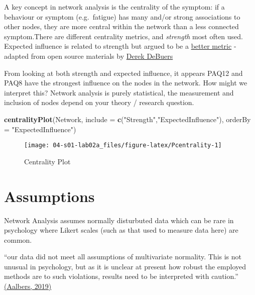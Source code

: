 \documentclass[]{book}
\newenvironment{Shaded}{\begin{snugshade}}{\end{snugshade}}
\newcommand{\DataTypeTok}[1]{\textcolor[rgb]{0.13,0.29,0.53}{#1}}
\newcommand{\KeywordTok}[1]{\textcolor[rgb]{0.13,0.29,0.53}{\textbf{#1}}}
\newcommand{\NormalTok}[1]{#1}
\newcommand{\StringTok}[1]{\textcolor[rgb]{0.31,0.60,0.02}{#1}}
\begin{document}
A key concept in network analysis is the centrality of the symptom: if a behaviour or symptom (e.g.~fatigue) has many and/or strong associations to other nodes, they are more central within the network than a less connected symptom.There are different centrality metrics, and \emph{strength} most often used. Expected influence is related to strength but argued to be a \href{https://psych-networks.com/expected-influence-new-centrality-metric-robinaugh-et-al-2016/}{better metric} - adapted from open source materials by \href{https://derekdebeurs.github.io/esssb17/}{Derek DeBuers}

From looking at both strength and expected influence, it appears PAQ12 and PAQ8 have the strongest influence on the nodes in the network. How might we interpret this? Network analysis is purely statistical, the measurement and inclusion of nodes depend on your theory / research question.

\begin{Shaded}
\begin{Highlighting}[]
\KeywordTok{centralityPlot}\NormalTok{(Network, }\DataTypeTok{include =} \KeywordTok{c}\NormalTok{(}\StringTok{"Strength"}\NormalTok{,}\StringTok{"ExpectedInfluence"}\NormalTok{),}
               \DataTypeTok{orderBy =} \StringTok{"ExpectedInfluence"}\NormalTok{)}
\end{Highlighting}
\end{Shaded}

\begin{figure}

{\centering \texttt{[image: 04-s01-lab02a\_files/figure-latex/Pcentrality-1]} 

}

\caption{Centrality Plot}\label{fig:Pcentrality}
\end{figure}

\hypertarget{assumptions}{%
\section{Assumptions}\label{assumptions}}

Network Analysis assumes normally disturbuted data which can be rare in psychology where Likert scales (such as that used to measure data here) are common.

``our data did not meet all assumptions of multivariate normality. This is not unusual in psychology, but as it is unclear at present how robust the employed methods are to such violations, results need to be interpreted with caution.'' \href{https://openaccess.leidenuniv.nl/bitstream/handle/1887/73951/Aalbers_et_al_2018_T.pdf?sequence=1}{(Aalbers, 2019)}
\end{document}
